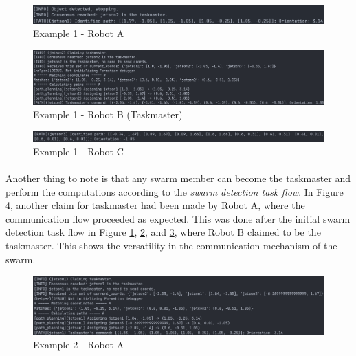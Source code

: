 \begin{figure} [H]
    \centering
    \includegraphics[width=1\linewidth]{assets/images/communication/example1-a.png}
    \caption{Example 1 - Robot A}
    \label{fig:example1-robot-a}
\end{figure}

\begin{figure} [H]
    \centering
    \includegraphics[width=1\linewidth]{assets/images/communication/example1-b-master.png}
    \caption{Example 1 - Robot B (Taskmaster)}
    \label{fig:example1-robot-b}
\end{figure}

\begin{figure} [H]
    \centering
    \includegraphics[width=1\linewidth]{assets/images/communication/example1-c.png}
    \caption{Example 1 - Robot C}
    \label{fig:example1-robot-c}
\end{figure}

\paragraph*{}
Another thing to note is that any swarm member can become the taskmaster and perform the computations according to the \textit{swarm detection task flow}. In Figure \ref{fig:example2-robot-a}, another claim for taskmaster had been made by Robot A, where the communication flow proceeded as expected. This was done after the initial swarm detection task flow in Figure \ref{fig:example1-robot-a}, \ref{fig:example1-robot-b}, and \ref{fig:example1-robot-c}, where Robot B claimed to be the taskmaster. This shows the versatility in the communication mechanism of the swarm. 

\begin{figure} [H]
    \centering
    \includegraphics[width=1\linewidth]{assets/images/communication/example2-a-master.png}
    \caption{Example 2 - Robot A}
    \label{fig:example2-robot-a}
\end{figure}


